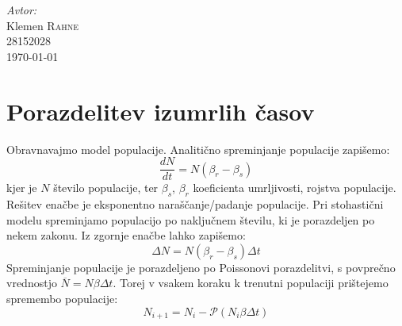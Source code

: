\documentclass[slovene,11pt,a4paper]{article}
\numberwithin{equation}{section} %
\numberwithin{figure}{section} %
\numberwithin{table}{section} %
\begin{document}
\begin{titlepage}



\Large \emph{Avtor:}\\
Klemen \textsc{Rahne}\\
28152028\\[2cm]

{\large \today } \\[0.5cm] %

	

\end{titlepage}






\section{Porazdelitev izumrlih časov}

Obravnavajmo model populacije. Analitično spreminjanje populacije zapišemo:
\begin{equation}
\frac{d N}{dt}= N (\beta_r - \beta_s )
\end{equation}
kjer je $N$ število populacije, ter $\beta_s$, $\beta_r$ koeficienta umrljivosti, rojstva populacije. Rešitev enačbe je eksponentno naraščanje/padanje populacije. Pri stohastični modelu spreminjamo populacijo po naključnem številu, ki je porazdeljen po nekem zakonu. Iz zgornje enačbe lahko zapišemo:
\begin{equation}
\Delta N= N (\beta_r - \beta_s ) \Delta t
\label{enačba-1}
\end{equation}
Spreminjanje populacije je porazdeljeno po Poissonovi porazdelitvi, s povprečno vrednostjo $\overline{ N}= N \beta \Delta t$. Torej v vsakem koraku k trenutni populaciji prištejemo spremembo populacije:
\begin{equation}
N_{i+1}=N_i - \mathcal{P}(N_i \beta \Delta t)
\label{enačba-2}
\end{equation}
\end{document}
